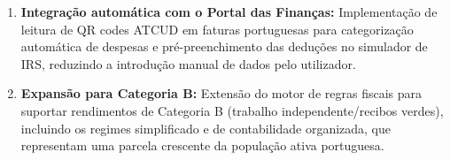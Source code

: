 \begin{enumerate}
    \item \textbf{Integração automática com o Portal das Finanças:} Implementação de leitura de QR codes \ac{ATCUD} em faturas portuguesas para categorização automática de despesas e pré-preenchimento das deduções no simulador de \ac{IRS}, reduzindo a introdução manual de dados pelo utilizador.

    \item \textbf{Expansão para Categoria B:} Extensão do motor de regras fiscais para suportar rendimentos de Categoria B (trabalho independente/recibos verdes), incluindo os regimes simplificado e de contabilidade organizada, que representam uma parcela crescente da população ativa portuguesa.
\end{enumerate}
